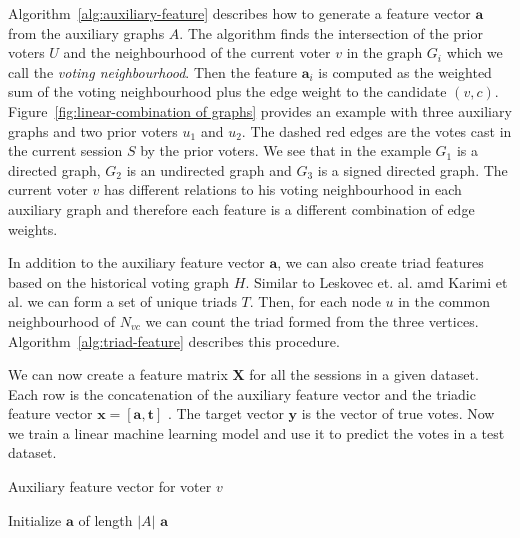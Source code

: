 Algorithm~\ref{alg:auxiliary-feature} describes how to generate a feature vector $\mathbf{a}$ from the auxiliary graphs $A$. The algorithm finds the intersection of the prior voters $U$ and the neighbourhood of the current voter $v$ in the graph $G_i$ which we call the \textit{voting neighbourhood}. Then the feature $\mathbf{a}_i$ is computed as the weighted sum of the voting neighbourhood plus the edge weight to the candidate $(v,c)$. Figure~\ref{fig:linear-combination of graphs} provides an example with three auxiliary graphs and two prior voters $u_1$ and $u_2$. The dashed red edges are the votes cast in the current session $S$ by the prior voters. We see that in the example $G_1$ is a directed graph, $G_2$ is an undirected graph and $G_3$ is a signed directed graph. The current voter $v$ has different relations to his voting neighbourhood in each auxiliary graph and therefore each feature is a different combination of edge weights. 

In addition to the auxiliary feature vector $\mathbf{a}$, we can also create triad features based on the historical voting graph $H$. Similar to Leskovec et. al. \cite{leskovec2010predicting} amd Karimi et al. \cite{karimi2019multicongress} we can form a set of unique triads $T$. Then, for each node $u$ in the common neighbourhood of $N_{vc}$ we can count the triad formed from the three vertices. Algorithm~\ref{alg:triad-feature} describes this procedure. 

We can now create a feature matrix $\mathbf{X}$ for all the sessions in a given dataset. Each row is the concatenation of the auxiliary feature vector and the triadic feature vector $\mathbf{x} = [\mathbf{a},\mathbf{t}]$ . The target vector $\mathbf{y}$ is the vector of true votes. Now we train a linear machine learning model and use it to predict the votes in a test dataset.

\begin{algorithm}[H]
    \DontPrintSemicolon
    \caption{Auxiliary feature vector for voter $v$ }
    \label{alg:auxiliary-feature}
    Initialize $\mathbf{a}$ of length $|A|$\;
    \Return $\mathbf{a}$
\end{algorithm}

